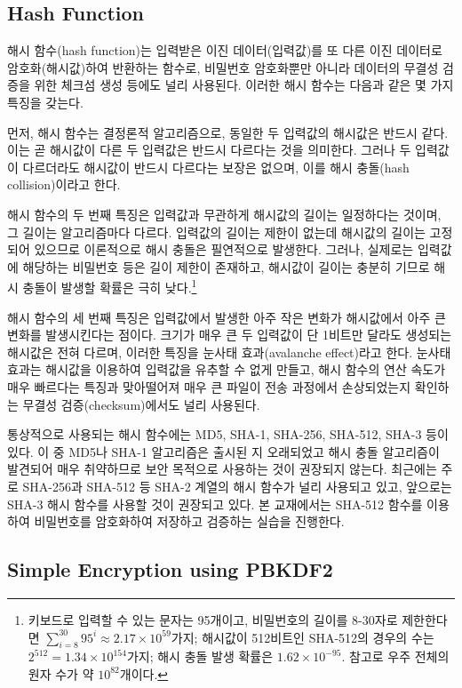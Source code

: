 \subsection*{Hash Function}

해시 함수(hash function)는 입력받은 이진 데이터(입력값)를 또 다른 이진 데이터로 암호화(해시값)하여 반환하는 함수로, 비밀번호 암호화뿐만 아니라 데이터의 무결성 검증을 위한 체크섬 생성 등에도 널리 사용된다. 이러한 해시 함수는 다음과 같은 몇 가지 특징을 갖는다.

먼저, 해시 함수는 결정론적 알고리즘으로, 동일한 두 입력값의 해시값은 반드시 같다. 이는 곧 해시값이 다른 두 입력값은 반드시 다르다는 것을 의미한다. 그러나 두 입력값이 다르더라도 해시값이 반드시 다르다는 보장은 없으며, 이를 해시 충돌(hash collision)이라고 한다.

해시 함수의 두 번째 특징은 입력값과 무관하게 해시값의 길이는 일정하다는 것이며, 그 길이는 알고리즘마다 다르다. 입력값의 길이는 제한이 없는데 해시값의 길이는 고정되어 있으므로 이론적으로 해시 충돌은 필연적으로 발생한다. 그러나, 실제로는 입력값에 해당하는 비밀번호 등은 길이 제한이 존재하고, 해시값이 길이는 충분히 기므로 해시 충돌이 발생할 확률은 극히 낮다.\footnote{키보드로 입력할 수 있는 문자는 95개이고, 비밀번호의 길이를 8-30자로 제한한다면 $\sum_{i=8}^{30}95^i\approx 2.17\times 10^{59}$가지; 해시값이 512비트인 SHA-512의 경우의 수는 $2^{512}=1.34\times 10^{154}$가지; 해시 충돌 발생 확률은 $1.62\times 10^{-95}$. 참고로 우주 전체의 원자 수가 약 $10^{82}$개이다.}

해시 함수의 세 번째 특징은 입력값에서 발생한 아주 작은 변화가 해시값에서 아주 큰 변화를 발생시킨다는 점이다. 크기가 매우 큰 두 입력값이 단 1비트만 달라도 생성되는 해시값은 전혀 다르며, 이러한 특징을 눈사태 효과(avalanche effect)라고 한다. 눈사태 효과는 해시값을 이용하여 입력값을 유추할 수 없게 만들고, 해시 함수의 연산 속도가 매우 빠르다는 특징과 맞아떨어져 매우 큰 파일이 전송 과정에서 손상되었는지 확인하는 무결성 검증(checksum)에서도 널리 사용된다.

통상적으로 사용되는 해시 함수에는 MD5, SHA-1, SHA-256, SHA-512, SHA-3 등이 있다. 이 중 MD5나 SHA-1 알고리즘은 출시된 지 오래되었고 해시 충돌 알고리즘이 발견되어 매우 취약하므로 보안 목적으로 사용하는 것이 권장되지 않는다. 최근에는 주로 SHA-256과 SHA-512 등 SHA-2 계열의 해시 함수가 널리 사용되고 있고, 앞으로는 SHA-3 해시 함수를 사용할 것이 권장되고 있다. 본 교재에서는 SHA-512 함수를 이용하여 비밀번호를 암호화하여 저장하고 검증하는 실습을 진행한다.

\subsection*{Simple Encryption using PBKDF2}

